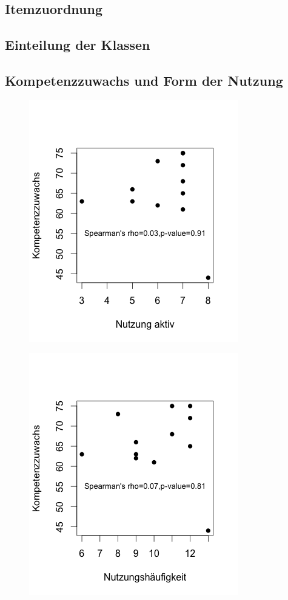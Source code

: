 \documentclass[12pt,smallheadings, bibliography=totoc]{scrartcl}
\begin{document}
  \subsection{Itemzuordnung}
  \label{sec:item}
  
  \subsection{Einteilung der Klassen}
  \label{sec:klasse}
  
  \subsection{Kompetenzzuwachs und Form der Nutzung}
  \label{sec:aktiv}
  \begin{figure}[H]
\includegraphics[width=0.4\linewidth]{Anhang/spearaktiv.png}
\end{figure}
\begin{figure}[H]
\includegraphics[width=0.4\linewidth]{Anhang/speerpassiv.png}
\end{figure}
\end{document}
